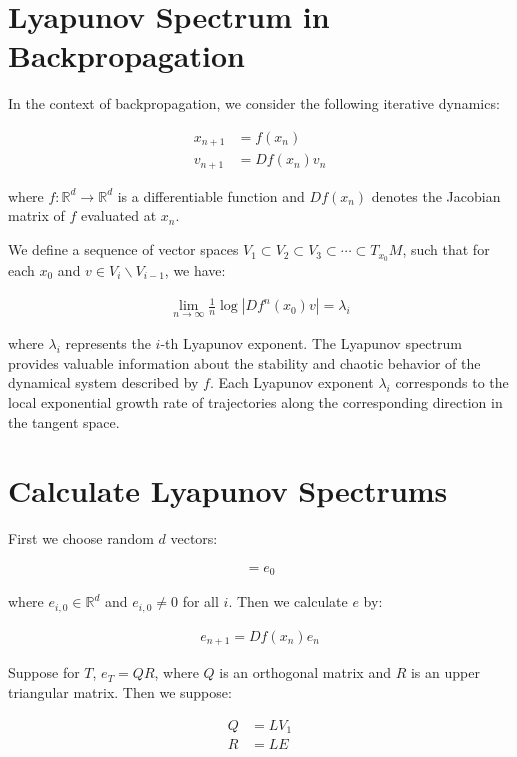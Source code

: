 \documentclass{article}
\begin{document}
\section*{Lyapunov Spectrum in Backpropagation}

In the context of backpropagation, we consider the following iterative dynamics:

\begin{align}
    x_{n+1} &= f(x_n) \\
    v_{n+1} &= Df(x_n)v_n
\end{align}

where $f: \mathbb{R}^d \rightarrow \mathbb{R}^d$ is a differentiable function and $Df(x_n)$ denotes the Jacobian matrix of $f$ evaluated at $x_n$.

We define a sequence of vector spaces $V_1 \subset V_2 \subset V_3 \subset \cdots \subset T_{x_0}M$, such that for each $x_0$ and $v \in V_i \backslash V_{i-1}$, we have:

\begin{align}
    \lim_{n \to \infty} \frac{1}{n} \log |Df^n(x_0)v| = \lambda_i
\end{align}

where $\lambda_i$ represents the $i$-th Lyapunov exponent. The Lyapunov spectrum provides valuable information about the stability and chaotic behavior of the dynamical system described by $f$. Each Lyapunov exponent $\lambda_i$ corresponds to the local exponential growth rate of trajectories along the corresponding direction in the tangent space.

\section*{Calculate Lyapunov Spectrums}

First we choose random $d$ vectors:

\begin{align}
    [e_{1,0}, e_{2,0}, \cdots, e_{d,0}] = e_0
\end{align}

where $e_{i,0} \in \mathbb{R}^d$ and $e_{i,0} \neq 0$ for all $i$. Then we calculate $e$ by:

\begin{align}
    e_{n+1} = Df(x_n)e_{n}
\end{align}

Suppose for $T$, $e_T=QR$, where $Q$ is an orthogonal matrix and $R$ is an upper triangular matrix. Then we suppose:

\begin{align}
    Q &= LV_1 \\
    R &= LE
\end{align}
\end{document}
